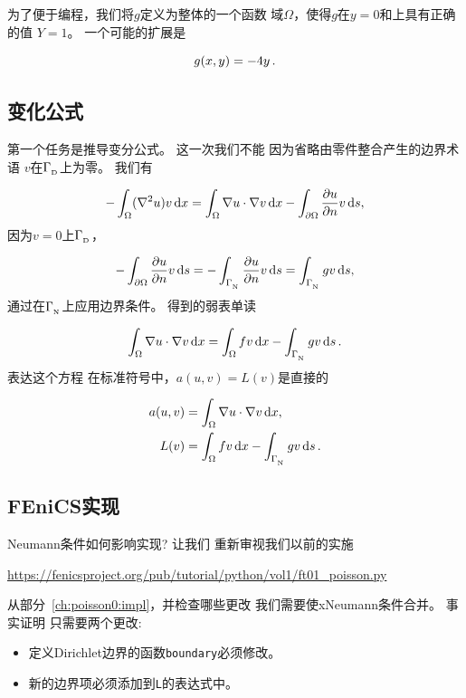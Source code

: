 为了便于编程，我们将$g$定义为整体的一个函数
域$\Omega$，使得$g$在$y=0$和上具有正确的值
$Y=1$。 一个可能的扩展是

\begin{equation*}
g(x,y) = -4y\thinspace .
\end{equation*}

\subsection{变化公式}

第一个任务是推导变分公式。 这一次我们不能
因为省略由零件整合产生的边界术语
$v$在$\Gamma_{_\mathrm{D}}$上为零。 我们有

\begin{equation*}
 -\int_\Omega (\nabla^2 u)v \, \mathrm{d}x
= \int_\Omega\nabla u\cdot\nabla v \, \mathrm{d}x - \int_{\partial\Omega}{\partial u\over
\partial n}v \, \mathrm{d}s,
\end{equation*}
因为$v=0$上$\Gamma_{_\mathrm{D}}$，

\begin{equation*}
- \int_{\partial\Omega}{\partial u\over
\partial n}v \, \mathrm{d}s
=
- \int_{\Gamma_{_\mathrm{N}}}{\partial u\over
\partial n}v \, \mathrm{d}s
= \int_{\Gamma_{_\mathrm{N}}}gv \, \mathrm{d}s,
\end{equation*}
通过在$\Gamma_{_\mathrm{N}}$上应用边界条件。
得到的弱表单读

\begin{equation}
\int_{\Omega} \nabla u \cdot \nabla v \, \mathrm{d}x
= \int_{\Omega} fv \, \mathrm{d}x - \int_{\Gamma_{_\mathrm{N}}} gv \, \mathrm{d}s\thinspace .
\label{ch:poisson0:2D:DN:weak}
\end{equation}
表达这个方程
在标准符号中，$a(u,v)=L(v)$是直接的

\begin{align}
a(u, v) &= \int_{\Omega} \nabla u \cdot \nabla v \, \mathrm{d}x,
\label{ftut:poisson2:vard:a}\\
L(v) &= \int_{\Omega} fv \, \mathrm{d}x -
\int_{\Gamma_{_\mathrm{N}}} gv \, \mathrm{d}s\thinspace .  \label{ftut:poisson2:vard:L}
\end{align}

\subsection{FEniCS实现}

Neumann条件如何影响实现? 让我们
重新审视我们以前的实施
\begin{center}
\url{https://fenicsproject.org/pub/tutorial/python/vol1/ft01_poisson.py}
\end{center}
从部分~\ref{ch:poisson0:impl}，并检查哪些更改
我们需要使xNeumann条件合并。 事实证明
只需要两个更改:

\begin{itemize}
  \item 定义Dirichlet边界的函数\texttt{boundary}必须修改。

  \item 新的边界项必须添加到\texttt{L}的表达式中。
\end{itemize}


